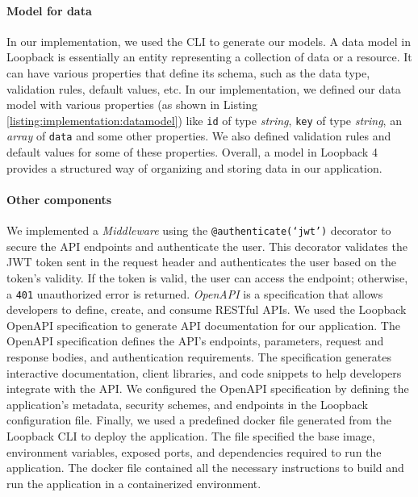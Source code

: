 \paragraph{Model for data}
In our implementation, we used the CLI to generate our models.
A data model in Loopback is essentially an entity representing a collection of data or a resource. It can have various properties that define its schema, such as the data type, validation rules, default values, etc.
In our implementation, we defined our data model with various properties (as shown in Listing \ref{listing:implementation:datamodel}) like \texttt{id} of type \textit{string}, \texttt{key} of type \textit{string}, an \textit{array} of \texttt{data} and some other properties.
We also defined validation rules and default values for some of these properties.
Overall, a model in Loopback 4 provides a structured way of organizing and storing data in our application.

\paragraph{Other components}
We implemented a \textit{Middleware} using the \texttt{@authenticate(`jwt')} decorator to secure the API endpoints and authenticate the user. 
This decorator validates the JWT token sent in the request header and authenticates the user based on the token's validity. 
If the token is valid, the user can access the endpoint; otherwise, a \texttt{401} unauthorized error is returned.
\textit{OpenAPI} is a specification that allows developers to define, create, and consume RESTful APIs. 
We used the Loopback OpenAPI specification to generate API documentation for our application. 
The OpenAPI specification defines the API's endpoints, parameters, request and response bodies, and authentication requirements. 
The specification generates interactive documentation, client libraries, and code snippets to help developers integrate with the API. 
We configured the OpenAPI specification by defining the application's metadata, security schemes, and endpoints in the Loopback configuration file.
Finally, we used a predefined docker file generated from the Loopback CLI to deploy the application. 
The file specified the base image, environment variables, exposed ports, and dependencies required to run the application. 
The docker file contained all the necessary instructions to build and run the application in a containerized environment.

